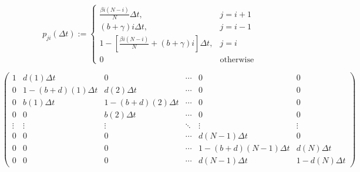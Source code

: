     \begin{frame}{}
        \begin{equation*}
            p_{ji}(\Delta t):=
                \begin{cases}
                    \frac{\beta i (N - i)}{N} \Delta t,     
                        & j = i + 1
                    \\
                    (b + \gamma) i \Delta t, 
                        &   j = i - 1
                    \\
                    1 - \left [
                            \frac{\beta i (N - i)}{N} +
                            (b + \gamma) i %
                        \right] \Delta t, 
                        & j=i
                    \\
                    0 & \text{otherwise}
                \end{cases}
        \end{equation*}
    \end{frame}
    \begin{frame}{}
        \begin{equation*}
            \begin{pmatrix}
                1   & d(1) \Delta t & 0 & \cdots    & 0 & 0
                \\
                0   & 1 - (b+d)(1) \Delta t     & d(2)  \Delta t    & \cdots    & 0 & 0 
                \\
                0   &   b(1) \Delta t   & 1 - (b+d)(2) \Delta t     & \cdots    & 0 & 0
                \\
                0   & 0 & b(2) \Delta t     & \cdots    & 0 & 0
                \\
                \vdots  & \vdots & \vdots   & \ddots    & \vdots    & \vdots
                \\
                0   & 0 & 0 & \cdots & d (N - 1) \Delta t   & 0
                \\
                0   & 0 & 0 & \cdots & 1- (b+d) (N - 1) \Delta t    & d(N) \Delta t
                \\
                0   & 0 & 0 & \cdots & d (N - 1) \Delta t   &  1 - d(N) \Delta t 
            \end{pmatrix}
        \end{equation*}
    \end{frame}
